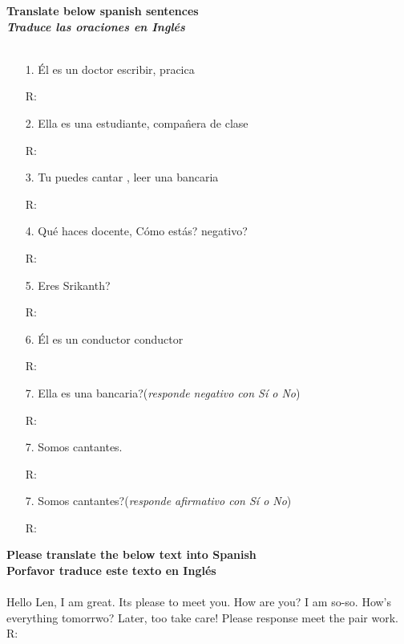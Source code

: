 \documentclass{article}
\begin{document}
\noindent \textbf{Translate below spanish sentences}\\
\noindent \textbf{\textit{Traduce las oraciones en Ingl\'es}}\\\\
\begin{itemize}
\item[1.] \'El es un doctor escribir, pracica
\item[R:]
\item[2.] Ella es una estudiante, compa\^nera de clase
\item[R:] 
\item[3.] Tu puedes cantar , leer una bancaria
\item[R:]
\item[4.] Qu\'e haces docente, C\'omo est\'as? negativo?
\item[R:]
\item[5.] Eres Srikanth?
\item[R:]
\item[6.] \'El es un conductor conductor
\item[R:]
\item[7.] Ella es una bancaria?(\textit{responde negativo con S\'i o No})
\item[R:]
\item[7.] Somos cantantes.
\item[R:]
\item[7.] Somos cantantes?(\textit{responde afirmativo con S\'i o No})
\item[R:]
\end{itemize}

\newpage
\noindent \textbf{Please translate the below text into Spanish}\\
\noindent \textbf{Porfavor traduce este texto en Ingl\'es}\\\\
\noindent Hello Len, I am great. Its please to meet you. How are you? I am so-so.
How's everything tomorrwo? Later, too take care! Please response meet the pair work.\\
R: 
\end{document}
